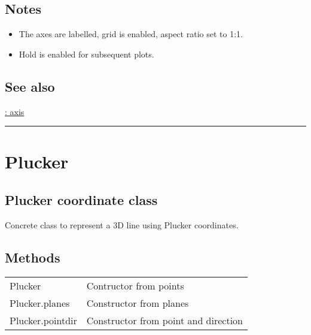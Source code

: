 \subsection*{Notes}
\begin{itemize}
  \item The axes are labelled, grid is enabled, aspect ratio set to 1:1.
  \item Hold is enabled for subsequent plots.
\end{itemize}

\subsection*{See also}


\hyperlink{: axis}{\color{blue} : axis}

\vspace{1.5ex}\rule{\textwidth}{1mm}

\hypertarget{Plucker}{\section*{Plucker}}
\subsection*{Plucker coordinate class}


Concrete class to represent a 3D line using Plucker coordinates.


\subsection*{Methods}
\begin{longtable}{lp{120mm}}
Plucker & Contructor from points\\ 
Plucker.planes & Constructor from planes\\ 
Plucker.pointdir & Constructor from point and direction\\ 
\end{longtable}\vspace{1ex}

